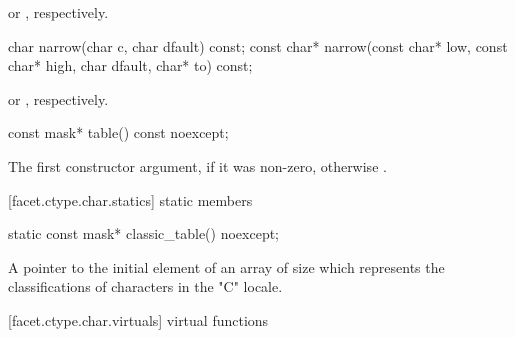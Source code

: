 \begin{itemdescr}
\pnum
\returns
{}
or
%
,
respectively.
\end{itemdescr}

%
%
\begin{itemdecl}
char        narrow(char c, char dfault) const;
const char* narrow(const char* low, const char* high,
                   char dfault, char* to) const;
\end{itemdecl}

\begin{itemdescr}
\pnum
\returns
{}%
or
%
,
respectively.
\end{itemdescr}

%
%
\begin{itemdecl}
const mask* table() const noexcept;
\end{itemdecl}

\begin{itemdescr}
\pnum
\returns
The first constructor argument, if it was non-zero, otherwise
.
\end{itemdescr}

[facet.ctype.char.statics]{ static members}

%
%
\begin{itemdecl}
static const mask* classic_table() noexcept;
\end{itemdecl}

\begin{itemdescr}
\pnum
\returns
A pointer to the initial element of an array of size
which represents the classifications of characters in the "C" locale.
\end{itemdescr}

[facet.ctype.char.virtuals]{ virtual functions}

